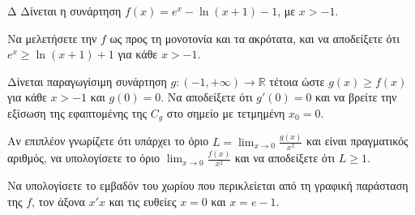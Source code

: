 \begin{thema}{Δ}
Δίνεται η συνάρτηση $f(x) = e^x - \ln(x+1) - 1$, με $x > -1$.
\begin{erwthma}
    \item Να μελετήσετε την $f$ ως προς τη μονοτονία και τα ακρότατα, και να αποδείξετε ότι $e^x \ge \ln(x+1) + 1$ για κάθε $x > -1$.
    \item Δίνεται παραγωγίσιμη συνάρτηση $g: (-1, +\infty) \to \mathbb{R}$ τέτοια ώστε $g(x) \ge f(x)$ για κάθε $x > -1$ και $g(0) = 0$. Να αποδείξετε ότι $g'(0) = 0$ και να βρείτε την εξίσωση της εφαπτομένης της $C_g$ στο σημείο με τετμημένη $x_0 = 0$.
    \item Αν επιπλέον γνωρίζετε ότι υπάρχει το όριο $\displaystyle L = \lim_{x\to 0} \frac{g(x)}{x^2}$ και είναι πραγματικός αριθμός, να υπολογίσετε το όριο $\displaystyle \lim_{x\to 0} \frac{f(x)}{x^2}$ και να αποδείξετε ότι $L \ge 1$.
    \item Να υπολογίσετε το εμβαδόν του χωρίου που περικλείεται από τη γραφική παράσταση της $f$, τον άξονα $x'x$ και τις ευθείες $x=0$ και $x=e-1$.
\end{erwthma}
\end{thema}
